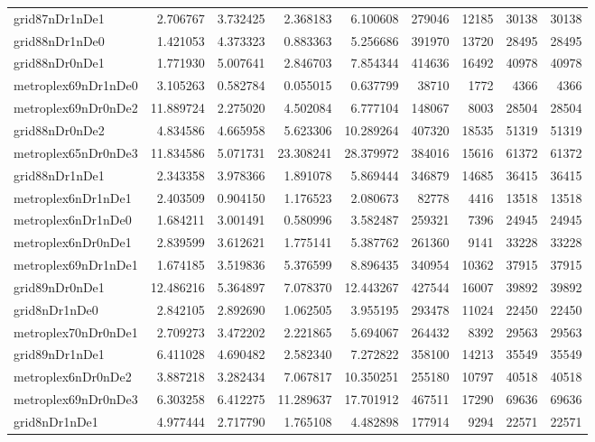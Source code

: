 \begin{longtable}{|l|r|r|r|r|r|r|r|r|}
grid87nDr1nDe1 & 2.706767 & 3.732425 & 2.368183 & 6.100608 & 279046 & 12185 & 30138 & 30138 \\
grid88nDr1nDe0 & 1.421053 & 4.373323 & 0.883363 & 5.256686 & 391970 & 13720 & 28495 & 28495 \\
grid88nDr0nDe1 & 1.771930 & 5.007641 & 2.846703 & 7.854344 & 414636 & 16492 & 40978 & 40978 \\
metroplex69nDr1nDe0 & 3.105263 & 0.582784 & 0.055015 & 0.637799 & 38710 & 1772 & 4366 & 4366 \\
metroplex69nDr0nDe2 & 11.889724 & 2.275020 & 4.502084 & 6.777104 & 148067 & 8003 & 28504 & 28504 \\
grid88nDr0nDe2 & 4.834586 & 4.665958 & 5.623306 & 10.289264 & 407320 & 18535 & 51319 & 51319 \\
metroplex65nDr0nDe3 & 11.834586 & 5.071731 & 23.308241 & 28.379972 & 384016 & 15616 & 61372 & 61372 \\
grid88nDr1nDe1 & 2.343358 & 3.978366 & 1.891078 & 5.869444 & 346879 & 14685 & 36415 & 36415 \\
metroplex6nDr1nDe1 & 2.403509 & 0.904150 & 1.176523 & 2.080673 & 82778 & 4416 & 13518 & 13518 \\
metroplex6nDr1nDe0 & 1.684211 & 3.001491 & 0.580996 & 3.582487 & 259321 & 7396 & 24945 & 24945 \\
metroplex6nDr0nDe1 & 2.839599 & 3.612621 & 1.775141 & 5.387762 & 261360 & 9141 & 33228 & 33228 \\
metroplex69nDr1nDe1 & 1.674185 & 3.519836 & 5.376599 & 8.896435 & 340954 & 10362 & 37915 & 37915 \\
grid89nDr0nDe1 & 12.486216 & 5.364897 & 7.078370 & 12.443267 & 427544 & 16007 & 39892 & 39892 \\
grid8nDr1nDe0 & 2.842105 & 2.892690 & 1.062505 & 3.955195 & 293478 & 11024 & 22450 & 22450 \\
metroplex70nDr0nDe1 & 2.709273 & 3.472202 & 2.221865 & 5.694067 & 264432 & 8392 & 29563 & 29563 \\
grid89nDr1nDe1 & 6.411028 & 4.690482 & 2.582340 & 7.272822 & 358100 & 14213 & 35549 & 35549 \\
metroplex6nDr0nDe2 & 3.887218 & 3.282434 & 7.067817 & 10.350251 & 255180 & 10797 & 40518 & 40518 \\
metroplex69nDr0nDe3 & 6.303258 & 6.412275 & 11.289637 & 17.701912 & 467511 & 17290 & 69636 & 69636 \\
grid8nDr1nDe1 & 4.977444 & 2.717790 & 1.765108 & 4.482898 & 177914 & 9294 & 22571 & 22571 \\

\end{longtable}
